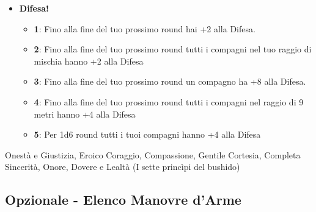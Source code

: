 \begin{multicols}{2}
\begin{itemize}[leftmargin=*]
\begin{itemize}[leftmargin=*]
		\item \textbf{2}: Berserker. Un tuo compagno entro sei metri può eseguire un'Azione di Attacco contro un avversario in mischia al costo di una Reazione.

		\item \textbf{3}: Scossa. Un tuo compagno, entro 6 metri, può usare una Reazione per eseguire un'Azione di Movimento trattando il terreno come difficile

		\item \textbf{4}: Gloria. I tuoi compagni entro 6 metri hanno +2 al Tiro per Colpire entro la fine del loro prossimo round

		\item \textbf{5}: Gloria! I tuoi compagni entro 9 metri hanno +4 al Tiro per Colpire entro la fine del loro prossimo round.
	\end{itemize}

	\item \textbf{Difesa!}
	\begin{itemize}[leftmargin=*]
		\setlength{\itemsep}{0pt}
		\item \textbf{1}: Fino alla fine del tuo prossimo round hai +2 alla Difesa.

		\item \textbf{2}: Fino alla fine del tuo prossimo round tutti i compagni nel tuo raggio di mischia hanno +2 alla Difesa

		\item \textbf{3}: Fino alla fine del tuo prossimo round un compagno ha +8 alla Difesa.

		\item \textbf{4}: Fino alla fine del tuo prossimo round tutti i compagni nel raggio di 9 metri hanno +4 alla Difesa

		\item \textbf{5}: Per 1d6 round tutti i tuoi compagni hanno +4 alla Difesa
	\end{itemize}

\end{itemize}

\medskip


\begin{enfasi}{
Onestà e Giustizia, Eroico Coraggio, Compassione, Gentile Cortesia, Completa Sincerità, Onore, Dovere e Lealtà (I sette princìpi del bushido)
}\end{enfasi}


\subsection{Opzionale - Elenco Manovre d'Arme}\hypertarget{elencotalentiarmi}{}\label{elencotalentiarmi}


\end{multicols}
